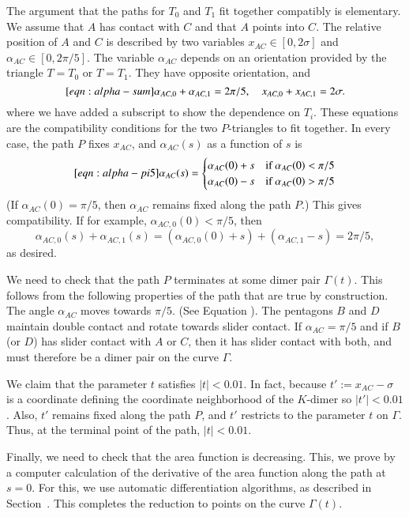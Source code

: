 The argument that the paths for $T_0$ and $T_1$ fit together compatibly is elementary.
We assume that $A$ has contact with $C$ and that $A$ points into $C$.
The relative position of $A$ and $C$ is described by two variables $x_{AC}\in[0,2\sigma]$ and 
$\alpha_{AC}\in[0,2\pi/5]$.
The variable $\alpha_{AC}$ depends on an orientation provided by the triangle $T=T_0$ or $T=T_1$.
They have opposite orientation, and 
\begin{equation}\libel{eqn:alpha-sum}
\alpha_{AC,0}+\alpha_{AC,1} = 2\pi/5,\quad x_{AC,0} + x_{AC,1} = 2\sigma.
\end{equation}
where we have added a subscript to show the dependence on $T_i$.  These equations are the
compatibility conditions for the two $P$-triangles to fit together.
In every case, the path $P$ fixes $x_{AC}$, and  $\alpha_{AC}(s)$ as a function of $s$ is
\begin{equation}\libel{eqn:alpha-pi5}
\alpha_{AC}(s) = 
\begin{cases}
\alpha_{AC}(0) + s&\text{if } \alpha_{AC}(0) < \pi/5\\
\alpha_{AC}(0) - s&\text{if } \alpha_{AC}(0) > \pi/5\\
\end{cases}
\end{equation}
(If $\alpha_{AC}(0) = \pi/5$, then $\alpha_{AC}$ remains fixed along the path $P$.)
This gives compatibility. If for example, $\alpha_{AC,0}(0) < \pi/5$, then
\[
\alpha_{AC,0}(s) + \alpha_{AC,1}(s) = (\alpha_{AC,0}(0) + s) + (\alpha_{AC,1} - s) = 2\pi/5,
\]
as desired.

We need to check that the path $P$ terminates at some dimer pair $\Gamma(t)$.  This follows from
the following properties of the path that are true by construction.  The angle $\alpha_{AC}$ moves
towards $\pi/5$. (See Equation ). The pentagons $B$ and $D$ maintain double contact
and rotate towards slider contact.   If $\alpha_{AC}=\pi/5$ and if $B$ (or $D$) has slider contact with $A$ or $C$,
then it has slider contact with both, and must therefore be a dimer pair on the curve $\Gamma$.

We claim that the parameter $t$ satisfies $|t|<0.01$.  In fact, 
because $t' := x_{AC}-\sigma$ is a coordinate defining the
coordinate neighborhood of the $K$-dimer so $|t'|<0.01$.  Also, $t'$ remains fixed along the path $P$,
and $t'$ restricts to the parameter $t$ on $\Gamma$.  Thus, at the terminal point of the path, $|t|<0.01$.

Finally, we need to check that the area function is decreasing. This, we prove by a computer calculation
of the derivative of the area function along the path at $s=0$.  For this, we use automatic differentiation algorithms,
as described in Section~.  This completes the reduction to points on the curve $\Gamma(t)$.


